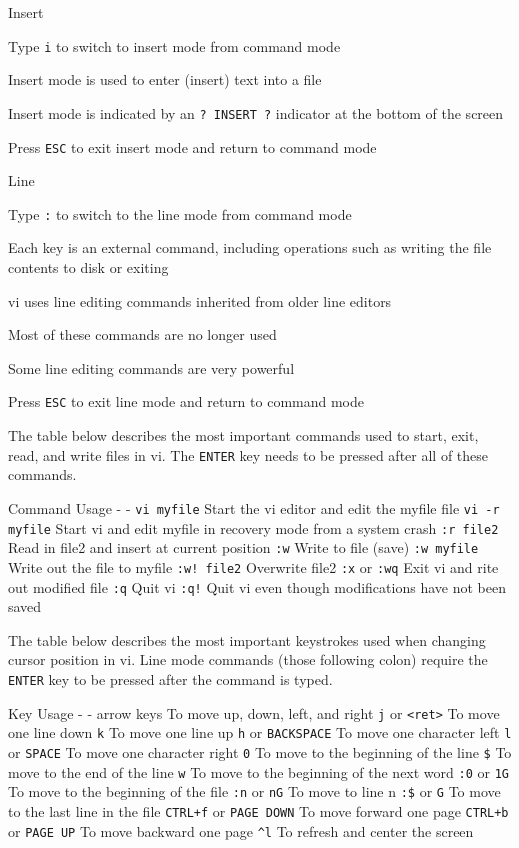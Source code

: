 Insert \textbar{}

Type \texttt{i} to switch to insert mode from command mode

Insert mode is used to enter (insert) text into a file

Insert mode is indicated by an \texttt{? INSERT ?} indicator at the
bottom of the screen

Press \texttt{ESC} to exit insert mode and return to command mode

Line \textbar{}

Type \texttt{:} to switch to the line mode from command mode

Each key is an external command, including operations such as writing
the file contents to disk or exiting

vi uses line editing commands inherited from older line editors

Most of these commands are no longer used

Some line editing commands are very powerful

Press \texttt{ESC} to exit line mode and return to command mode

The table below describes the most important commands used to start,
exit, read, and write files in vi. The \texttt{ENTER} key needs to be
pressed after all of these commands.

Command \textbar{} Usage - \textbar{} - \texttt{vi myfile} \textbar{}
Start the vi editor and edit the myfile file \texttt{vi -r myfile}
\textbar{} Start vi and edit myfile in recovery mode from a system crash
\texttt{:r file2} \textbar{} Read in file2 and insert at current
position \texttt{:w} \textbar{} Write to file (save) \texttt{:w myfile}
\textbar{} Write out the file to myfile \texttt{:w! file2} \textbar{}
Overwrite file2 \texttt{:x} or \texttt{:wq} \textbar{} Exit vi and rite
out modified file \texttt{:q} \textbar{} Quit vi \texttt{:q!} \textbar{}
Quit vi even though modifications have not been saved

The table below describes the most important keystrokes used when
changing cursor position in vi. Line mode commands (those following
colon) require the \texttt{ENTER} key to be pressed after the command is
typed.

Key \textbar{} Usage - \textbar{} - arrow keys \textbar{} To move up,
down, left, and right \texttt{j} or
\texttt{\textless{}ret\textgreater{}} \textbar{} To move one line down
\texttt{k} \textbar{} To move one line up \texttt{h} or
\texttt{BACKSPACE} \textbar{} To move one character left \texttt{l} or
\texttt{SPACE} \textbar{} To move one character right \texttt{0}
\textbar{} To move to the beginning of the line \texttt{\$} \textbar{}
To move to the end of the line \texttt{w} \textbar{} To move to the
beginning of the next word \texttt{:0} or \texttt{1G} \textbar{} To move
to the beginning of the file \texttt{:n} or \texttt{nG} \textbar{} To
move to line n \texttt{:\$} or \texttt{G} \textbar{} To move to the last
line in the file \texttt{CTRL+f} or \texttt{PAGE DOWN} \textbar{} To
move forward one page \texttt{CTRL+b} or \texttt{PAGE UP} \textbar{} To
move backward one page \texttt{\^{}l} \textbar{} To refresh and center
the screen

